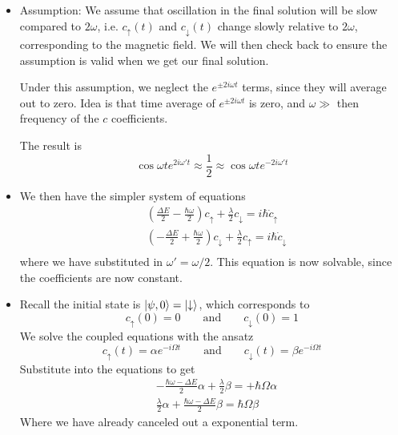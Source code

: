 \documentclass[11pt, a4paper]{article}
\newcommand{\eqtext}[1]{\qquad \text{#1} \qquad}
\newcommand{\p}{\psi}  %
\newcommand{\ua}{\uparrow}  %
\newcommand{\da}{\downarrow}  %
\begin{document}
\begin{itemize}
	\item Assumption: We assume that oscillation in the final solution will be slow compared to $ 2\omega $, i.e. $ c_{\ua}(t) $ and $ c_{\da}(t) $ change slowly relative to $ 2\omega $, corresponding to the magnetic field. We will then check back to ensure the assumption is valid when we get our final solution. 
	
	Under this assumption, we neglect the $ e^{\pm 2i\omega t} $ terms, since they will average out to zero. Idea is that time average of $ e^{\pm 2i\omega t} $ is zero, and $ \omega \gg  $ then frequency of the $ c $ coefficients. 
	
	The result is
	\begin{equation*}
		\cos \omega t e^{2i\omega't} \approx \frac{1}{2} \approx \cos \omega t e^{-2i\omega't}
	\end{equation*}
	
	\item We then have the simpler system of equations
	\begin{align*}
		&\left(\frac{\Delta E}{2} - \frac{\hbar \omega}{2} \right) c_{\ua} + \frac{\lambda}{2}c_{\da} = i\hbar \dot{c}_{\ua}\\
		&\left(-\frac{\Delta E}{2} + \frac{\hbar \omega}{2} \right) c_{\da} + \frac{\lambda}{2}c_{\ua} = i\hbar \dot{c}_{\da}\\
	\end{align*}
	where we have substituted in $ \omega' = \omega/2 $. This equation is now solvable, since the coefficients are now constant. 
	
	\item Recall the initial state is $ \ket{\p, 0} = \ket{\da} $, which corresponds to
	\begin{equation*}
		c_{\ua}(0) = 0 \eqtext{and} c_{\da}(0) = 1
	\end{equation*}
	We solve the coupled equations with the ansatz
	\begin{equation*}
		c_{\ua}(t) = \alpha e^{-i\Omega t} \eqtext{and} c_{\da}(t) = \beta e^{-i\Omega t}
	\end{equation*}
	Substitute into the equations to get
	\begin{align*}
		& -\frac{\hbar \omega - \Delta E}{2}\alpha + \frac{\lambda}{2}\beta = +\hbar \Omega \alpha\\
		& \frac{\lambda}{2} \alpha + \frac{\hbar \omega - \Delta E}{2}\beta = \hbar \Omega \beta
	\end{align*}
	Where we have already canceled out a exponential term.
	

\end{itemize}
\end{document}
